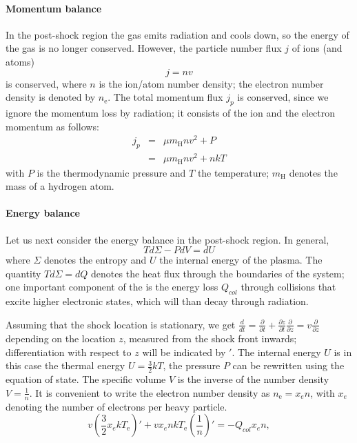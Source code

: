 \documentclass[graybox, nosecnum]{svmult}
\begin{document}
\paragraph{Momentum balance}\label{hydrodyn}

In the post-shock region the gas emits radiation and cools down, so the energy of the gas is no longer conserved.  However, the particle number flux $j$ of ions (and atoms) 
\begin{equation}j=nv\label{j_n}\end{equation}
is conserved, where $n$ is the ion/atom number density; the electron number density is denoted by $n_{\mathrm{e}}$. The total momentum flux $j_p$ is conserved, since we ignore the momentum loss by radiation; it consists of the ion and the electron momentum as follows:
\begin{eqnarray}  
j_p&=&\mu m_{\mathrm{H}} n v^2+P \nonumber \\
   &=&\mu m_{\mathrm{H}} n v^2+nkT \label{j_p}
\end{eqnarray}
with $P$ is the thermodynamic pressure and $T$ the temperature; $m_{\mathrm{H}}$ denotes the mass of a hydrogen atom.

\paragraph{Energy balance}
\label{sect:energybalance}

Let us next consider the energy balance in the post-shock region. In general,  
\begin{equation} \label{tsminuspdvisdu} T d\Sigma -P dV=dU \end{equation}
where $\Sigma$ denotes the entropy and $U$ the internal energy of the plasma. The quantity $T d\Sigma=dQ$ denotes the heat flux through the boundaries of the system; one important component of the is the energy loss $Q_{col}$ through collisions that excite higher electronic states, which will than decay through radiation. 

Assuming that the shock location is stationary, we get $\frac{d}{dt}=\frac{\partial}{\partial t}+\frac{\partial z}{\partial t}\frac{\partial}{\partial z}=v\frac{\partial}{\partial z}$ depending on the location $z$, measured from the shock front inwards; differentiation with respect to $z$ will be indicated by $'$.
The internal energy $U$ is in this case the thermal energy $U=\frac{3}{2}kT$, the pressure $P$ can be rewritten using the equation of state. The specific volume $V$ is the inverse of the number density $V=\frac{1}{n}$. 
It is convenient to write the electron number density as \mbox{$n_{\mathrm{e}}=x_e n$,} with $x_e$ denoting the number of electrons per heavy particle.
\begin{equation}
\label{energyelec}
v\left(\frac{3}{2}x_e k T_{\mathrm{e}}\right)'+v x_e n k T_{\mathrm{e}} \left(\frac{1}{n}\right)'=-Q_{col} x_e n,
\end{equation} 
\end{document}
